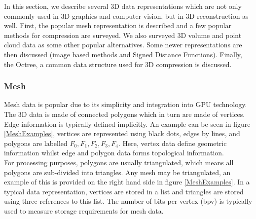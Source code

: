 
In this section, we describe several 3D data representations which are not only commonly used in 3D graphics and computer vision, but in 3D reconstruction as well. First, the popular mesh representation is described and a few popular methods for compression are surveyed. We also surveyed 3D volume and point cloud data as some other popular alternatives. Some newer representations are then discussed (image based methods and Signed Distance Functions). Finally, the Octree, a common data structure used for 3D compression is discussed. \\

\subsubsection{Mesh}

Mesh data is popular due to its simplicity and integration into GPU technology. The 3D data is made of connected polygons which in turn are made of vertices. Edge information is typically defined implicitly. An example can be seen in figure \ref{MeshExamples}, vertices are represented using black dots, edges by lines, and polygons are labelled $F_0, F_1, F_2, F_3, F_4$. Here, vertex data define geometric information whilst edge and polygon data forms topological information. \\

For processing purposes, polygons are usually triangulated, which means all polygons are sub-divided into triangles. Any mesh may be triangulated, an example of this is provided on the right hand side in figure \ref{MeshExamples}. In a typical data representation, vertices are stored in a list and triangles are stored using three references to this list. The number of bits per vertex (bpv) is typically used to measure storage requirements for mesh data. \\

